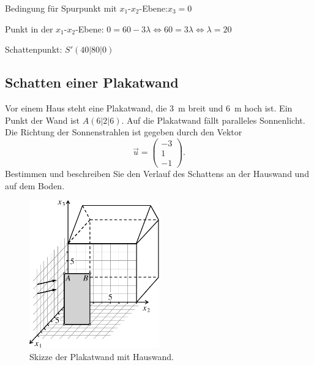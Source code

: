 \documentclass{ajc}
\numberwithin{equation}{subsection}
\begin{document}
	Bedingung für Spurpunkt mit $x_1$-$x_2$-Ebene:\quad $x_3 = 0$

	Punkt in der $x_1$-$x_2$-Ebene: $0 = 60 -3 \lambda \Leftrightarrow 60 = 3\lambda \Leftrightarrow \lambda = 20$
	
	Schattenpunkt: $S'(40|80|0)$
	
	\subsection{Schatten einer Plakatwand}
	Vor einem Haus steht eine Plakatwand, die \SI{3}{\m} breit und \SI{6}{m} hoch ist. Ein Punkt der Wand ist $A(6|2|6)$. Auf die Plakatwand fällt paralleles Sonnenlicht. Die Richtung der Sonnenstrahlen ist gegeben durch den Vektor
	\begin{equation*}
		\overrightarrow{u}=\left(\begin{array}{r} -3 \\ 1 \\ -1\end{array}\right).
	\end{equation*}
	Bestimmen und beschreiben Sie den Verlauf des Schattens an der Hauswand und auf dem Boden.
	
	\begin{figure}[ht]
		\centering
		\includegraphics[width=0.5\textwidth]{ma_001_schatten.pdf}
		\caption{Skizze der Plakatwand mit Hauswand.}
		\label{fig:001_schatten}
	\end{figure}
	
\end{document}
